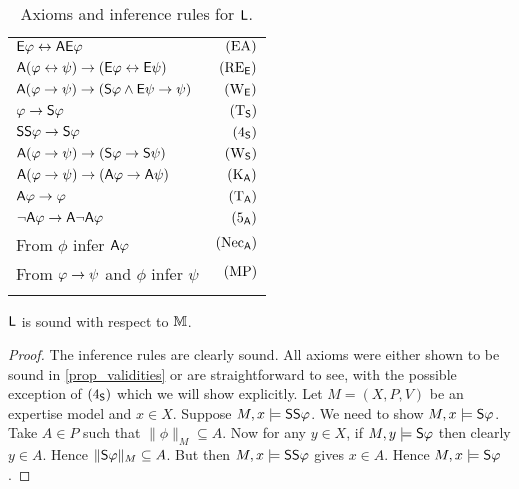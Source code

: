 \begin{table}
    \begin{center}
        \begin{minipage}{174pt}
            \caption{Axioms and inference rules for $\sL$.}
            \label{tab_axioms_general_case}
            \begin{tabular}{lr}
                \toprule
                 $\E\phi \liff \A\E\phi$
                     & $\EA$ \\
                 $\A(\phi \liff \psi) \limplies (\E\phi \liff \E\psi)$
                     & $\reE$ \\
                 $\A(\phi \limplies \psi) \limplies (\S\phi \land \E\psi \limplies \psi)$
                     & $\weakeningE$ \\
                 \midrule
                 $\phi \limplies \S\phi$
                     & $\Tsoundness$ \\
                 $\S\S\phi \limplies \S\phi$
                     & $\foursoundness$ \\
                 $\A(\phi \limplies \psi) \limplies (\S\phi \limplies \S\psi)$
                     & $\weakeningS$ \\
                 \midrule
                 $\A(\phi \limplies \psi) \limplies (\A\phi \limplies \A\psi)$
                     & $\Kuniv$ \\
                 $\A\phi \limplies \phi$
                     & $\Tuniv$ \\
                 $\neg\A\phi \limplies \A\neg\A\phi$
                     & $\fiveuniv$ \\
                 \midrule
                 From $\phi$ infer $\A\phi$
                     & $\necuniv$ \\
                 From $\phi \limplies \psi$ and $\phi$ infer $\psi$
                     & $\modpon$ \\
                \botrule
            \end{tabular}
        \end{minipage}
    \end{center}
\end{table}

\begin{lemma}
\label{lemma_soundness_m}
    $\sL$ is sound with respect to $\M$.
\end{lemma}

\begin{proof}
    The inference rules are clearly sound. All axioms were either shown to be
    sound in \cref{prop_validities} or are straightforward to see, with the
    possible exception of $\foursoundness$ which we will show explicitly. Let
    $M = (X, P, V)$ be an expertise model and $x \in X$. Suppose $M, x \models
    \S\S\phi$. We need to show $M, x \models \S\phi$. Take $A \in P$ such that
    $\|\phi\|_M \subseteq A$. Now for any $y \in X$, if $M, y \models \S\phi$
    then clearly $y \in A$. Hence $\|\S\phi\|_M \subseteq A$. But then $M, x
    \models \S\S\phi$ gives $x \in A$. Hence $M, x \models \S\phi$.
\end{proof}

